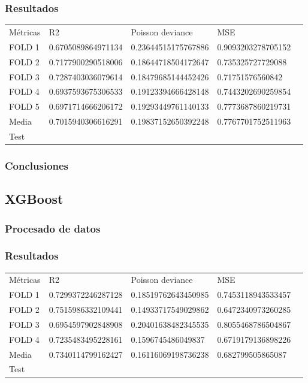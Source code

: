 \subsubsection{Resultados}
\begin{table}[htbp]
    \begin{tabular}{|l|l|l|l|l}
    \cline{1-4}
    Métricas & R2                 & Poisson deviance    & MSE                \\ \cline{1-4}
    FOLD 1   & 0.6705089864971134 & 0.23644515175767886 & 0.9093203278705152 \\ \cline{1-4}
    FOLD 2   & 0.7177900290518006 & 0.18644718504172647 & 0.735325727729088  \\ \cline{1-4}
    FOLD 3   & 0.7287403036079614 & 0.18479685144452426 & 0.71751576560842   \\ \cline{1-4}
    FOLD 4   & 0.6937593675306533 & 0.19123394666428148 & 0.7443202690259854 \\ \cline{1-4}
    FOLD 5   & 0.6971714666206172 & 0.19293449761140133 & 0.7773687860219731 \\ \cline{1-4}
    Media    & 0.7015940306616291 & 0.19837152650392248 & 0.7767701752511963 \\ \cline{1-4}
    Test & & & \\ \cline{1-4}
    \end{tabular}
\end{table}
\subsubsection{Conclusiones}

\subsection{XGBoost}
\subsubsection{Procesado de datos}
\subsubsection{Resultados}
\begin{table}[htbp]
    \begin{tabular}{|l|l|l|l|l}
    \cline{1-4}
    Métricas & R2                 & Poisson deviance     & MSE                \\ \cline{1-4}
    FOLD 1    & 0.7299372246287128 & 0.18519762643450985 & 0.7453118943533457 \\ \cline{1-4}
    FOLD 2    & 0.7515986332109441 & 0.14933717549029862 & 0.6472340973260285 \\ \cline{1-4}
    FOLD 3    & 0.6954597902848908 & 0.20401638482345535 & 0.8055468786504867 \\ \cline{1-4}
    FOLD 4    & 0.7235483495228161 & 0.1596745486049837  & 0.6719179136898226 \\ \cline{1-4}
    Media     & 0.7340114799162427 & 0.16116069198736238 & 0.682799505865087  \\ \cline{1-4}
    Test & & & \\ \cline{1-4}
\end{tabular}
\end{table}
